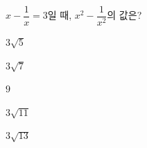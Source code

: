 $x-\dfrac{1}{x}=3$일 때, $x^2-\dfrac{1}{x^2}$의 값은? 
\begin{choices32}{\rule[-3ex]{0pt}{8ex}$3\sqrt{5}$}{\rule[-3ex]{0pt}{8ex}$3\sqrt{7}$}{\rule[-3ex]{0pt}{8ex}$9$}{\rule[-3ex]{0pt}{8ex}$3\sqrt{11}$}{\rule[-3ex]{0pt}{8ex}$3\sqrt{13}$}\end{choices32}
